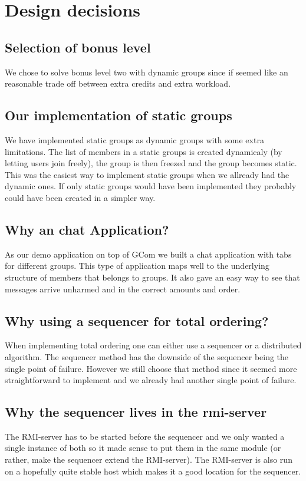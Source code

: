 \documentclass[a4paper,english]{article}
\begin{document}
\section{Design decisions}

\subsection{Selection of bonus level}
We chose to solve bonus level two with dynamic groups since if seemed like an reasonable trade off between extra credits and extra workload.

\subsection{Our implementation of static groups}
We have implemented static groups as dynamic groups with some extra limitations. The list of members in a static groups is created dynamicaly (by letting users join freely), the group is then freezed and the group becomes static. This was the easiest way to implement static groups when we allready had the dynamic ones. If only static groups would have been implemented they probably could have been created in a simpler way.

\subsection{Why an chat Application?}
As our demo application on top of GCom we built a chat application with tabs for different groups. This type of application maps well to the underlying structure of members that belongs to groups. It also gave an easy way to see that messages arrive unharmed and in the correct amounts and order. 

\subsection{Why using a sequencer for total ordering?}
When implementing total ordering one can either use a sequencer or a distributed algorithm. The sequencer method has the downside of the sequencer being the single point of failure. However we still choose that method since it seemed more straightforward to implement and we already had another single point of failure.

\subsection{Why the sequencer lives in the rmi-server}
The RMI-server has to be started before the sequencer and we only wanted a single instance of both so it made sense to put them in the same module (or rather, make the sequencer extend the RMI-server). The RMI-server is also run on a hopefully quite stable host which makes it a good location for the sequencer.
\end{document}
